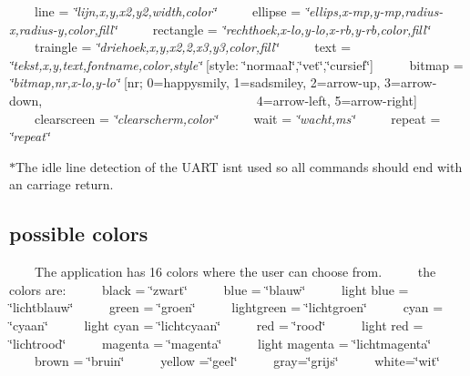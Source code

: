 ~~~~line = {\itshape \char`\"{}lijn,x,y,x2,y2,width,color\char`\"{}}~\newline
 ~~~~ellipse = {\itshape \char`\"{}ellips,x-\/mp,y-\/mp,radius-\/x,radius-\/y,color,fill\char`\"{}}~\newline
 ~~~~rectangle = {\itshape \char`\"{}rechthoek,x-\/lo,y-\/lo,x-\/rb,y-\/rb,color,fill\char`\"{}}~\newline
 ~~~~traingle = {\itshape \char`\"{}driehoek,x,y,x2,2,x3,y3,color,fill\char`\"{}}~\newline
 ~~~~text = {\itshape \char`\"{}tekst,x,y,text,fontname,color,style\char`\"{}} \mbox{[}style\+: \char`\"{}normaal\char`\"{},\char`\"{}vet\char`\"{},\char`\"{}cursief\char`\"{}\mbox{]}~\newline
 ~~~~bitmap = {\itshape \char`\"{}bitmap,nr,x-\/lo,y-\/lo\char`\"{}} \mbox{[}nr; 0=happysmily, 1=sadsmiley, 2=arrow-\/up, 3=arrow-\/down,~\newline
 ~~~~~~~~~~~~~~~~~~~~~~~~~~~~~~~~4=arrow-\/left, 5=arrow-\/right\mbox{]}~\newline
 ~~~~clearscreen = {\itshape \char`\"{}clearscherm,color\char`\"{}}~\newline
 ~~~~wait = {\itshape \char`\"{}wacht,ms\char`\"{}}~\newline
 ~~~~repeat = {\itshape \char`\"{}repeat\char`\"{}}~\newline


$\ast$\+The idle line detection of the U\+A\+RT isn\textquotesingle{}t used so all commands should end with an carriage return.\hypertarget{index_colors}{}\subsection{possible colors}\label{index_colors}
~~~~The application has 16 colors where the user can choose from.~\newline
 ~~~~the colors are\+:~\newline
 ~~~~black = \char`\"{}zwart\char`\"{}~\newline
 ~~~~blue = \char`\"{}blauw\char`\"{}~\newline
 ~~~~light blue = \char`\"{}lichtblauw\char`\"{}~\newline
 ~~~~green = \char`\"{}groen\char`\"{}~\newline
 ~~~~lightgreen = \char`\"{}lichtgroen\char`\"{}~\newline
 ~~~~cyan = \char`\"{}cyaan\char`\"{}~\newline
 ~~~~light cyan = \char`\"{}lichtcyaan\char`\"{}~\newline
 ~~~~red = \char`\"{}rood\char`\"{}~\newline
 ~~~~light red = \char`\"{}lichtrood\char`\"{}~\newline
 ~~~~magenta = \char`\"{}magenta\char`\"{}~\newline
 ~~~~light magenta = \char`\"{}lichtmagenta\char`\"{}~\newline
 ~~~~brown = \char`\"{}bruin\char`\"{}~\newline
 ~~~~yellow =\char`\"{}geel\char`\"{}~\newline
 ~~~~gray=\char`\"{}grijs\char`\"{}~\newline
 ~~~~white=\char`\"{}wit\char`\"{}~\newline
 